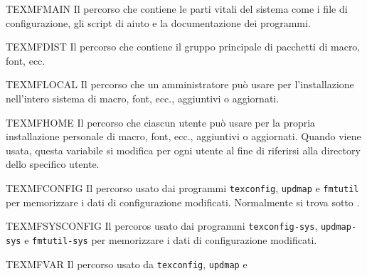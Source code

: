 \documentclass{article}
\begin{document}
\begin{ttdescription}
\item [TEXMFMAIN] Il percorso che contiene le parti vitali del sistema
  come i file di configurazione, gli script di aiuto e la documentazione
  dei programmi.
\item [TEXMFDIST] Il percorso che contiene il gruppo principale di
  pacchetti di macro, font, ecc.
\item [TEXMFLOCAL] Il percorso che un amministratore può usare per
  l'installazione nell'intero sistema di macro, font, ecc., aggiuntivi o
  aggiornati.
\item [TEXMFHOME] Il percorso che ciascun utente può usare per la propria
  installazione personale di macro, font, ecc., aggiuntivi o aggiornati.
  Quando viene usata, questa variabile si modifica per ogni utente al fine
  di riferirsi alla directory dello specifico utente.%
\item [TEXMFCONFIG] Il percorso usato dai programmi \verb+texconfig+,
  \verb+updmap+ e \verb+fmtutil+ per memorizzare i dati di configurazione
  modificati. Normalmente si trova sotto .
\item [TEXMFSYSCONFIG] Il percoros usato dai programmi
  \verb+texconfig-sys+, \verb+updmap-sys+ e \verb+fmtutil-sys+ per
  memorizzare i dati di configurazione modificati.
\item [TEXMFVAR] Il percorso usato da \verb+texconfig+, \verb+updmap+ e

\end{ttdescription}
\end{document}
